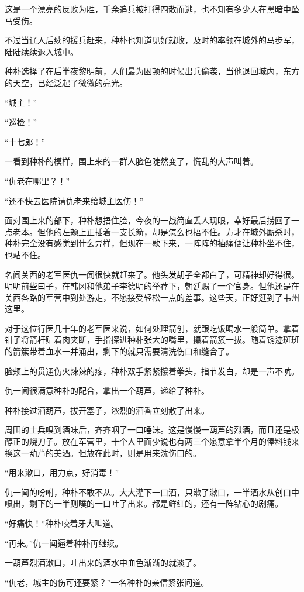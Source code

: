 这是一个漂亮的反败为胜，千余追兵被打得四散而逃，也不知有多少人在黑暗中坠马受伤。

不过当辽人后续的援兵赶来，种朴也知道见好就收，及时的率领在城外的马步军，陆陆续续退入城中。

种朴选择了在后半夜黎明前，人们最为困顿的时候出兵偷袭，当他退回城内，东方的天空，已经泛起了微微的亮光。

“城主！”

“巡检！”

“十七郎！”

一看到种朴的模样，围上来的一群人脸色陡然变了，慌乱的大声叫着。

“仇老在哪里？！”

“还不快去医院请仇老来给城主医伤！”

面对围上来的部下，种朴想捂住脸，今夜的一战简直丢人现眼，幸好最后捞回了一点老本。但他的左颊上正插着一支长箭，却是怎么也捂不住。方才在城外厮杀时，种朴完全没有感觉到什么异样，但现在一歇下来，一阵阵的抽痛便让种朴坐不住，也站不住。

名闻关西的老军医仇一闻很快就赶来了。他头发胡子全都白了，可精神却好得很。明明前些曰子，在韩冈和他弟子李德明的举荐下，朝廷赐了一个官身。但他还是在关西各路的军营中到处游走，不愿接受轻松一点的差事。这些天，正好逛到了韦州这里。

对于这位行医几十年的老军医来说，如何处理箭创，就跟吃饭喝水一般简单。拿着钳子将箭杆贴着肉夹断，手指探进种朴张大的嘴里，攥着箭簇一拔。随着锈迹斑斑的箭簇带着血水一并涌出，剩下的就只需要清洗伤口和缝合了。

脸颊上的贯通伤火辣辣的疼，种朴双手紧紧攥着拳头，指节发白，却是一声不吭。

仇一闻很满意种朴的配合，拿出一个葫芦，递给了种朴。

种朴接过酒葫芦，拔开塞子，浓烈的酒香立刻散了出来。

周围的士兵嗅到酒味后，齐齐咽了一口唾沫。这是慢慢一葫芦的烈酒，而且还是极醇正的烧刀子。放在军营里，十个人里面少说也有两三个愿意拿半个月的俸料钱来换这一葫芦的美酒。但放在此时，则是用来洗伤口的。

“用来漱口，用力点，好消毒！”

仇一闻的吩咐，种朴不敢不从。大大灌下一口酒，只漱了漱口，一半酒水从创口中喷出，剩下的一半则噗的一口吐了出来。都是鲜红的，还有一阵钻心的剧痛。

“好痛快！”种朴咬着牙大叫道。

“再来。”仇一闻逼着种朴再继续。

一葫芦烈酒漱口，吐出来的酒水中血色渐渐的就淡了。

“仇老，城主的伤可还要紧？”一名种朴的亲信紧张问道。

